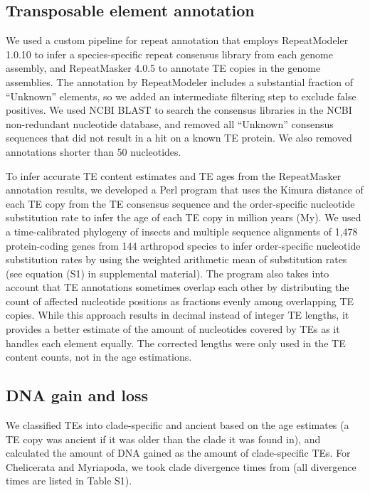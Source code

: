 \subsection{Transposable element
annotation}\label{transposable-element-annotation}

We used a custom pipeline for repeat annotation that employs
RepeatModeler 1.0.10 \citep{Smit2015} to infer a species-specific
repeat consensus library from each genome assembly, and RepeatMasker
4.0.5 \citep{Smit2015a} to annotate TE copies in the genome
assemblies. The annotation by RepeatModeler includes a substantial
fraction of ``Unknown'' elements, so we added an intermediate filtering
step to exclude false positives. We used NCBI BLAST to search the
consensus libraries in the NCBI non-redundant nucleotide database, and
removed all ``Unknown'' consensus sequences that did not result in a hit
on a known TE protein. We also removed annotations shorter than 50
nucleotides.

To infer accurate TE content estimates and TE ages from the RepeatMasker
annotation results, we developed a Perl program that uses the Kimura
distance of each TE copy from the TE consensus sequence and the
order-specific nucleotide substitution rate to infer the age of each TE
copy in million years (My). We used a time-calibrated phylogeny of
insects \citep{Misof2014} and multiple sequence alignments of 1,478
protein-coding genes from 144 arthropod species \citep{Misof2014} to
infer order-specific nucleotide substitution rates by using the weighted
arithmetic mean of substitution rates (see equation (S1) in supplemental
material). The program also takes into account that TE annotations
sometimes overlap each other by distributing the count of affected
nucleotide positions as fractions evenly among overlapping TE copies.
While this approach results in decimal instead of integer TE lengths, it
provides a better estimate of the amount of nucleotides covered by TEs
as it handles each element equally. The corrected lengths were only used
in the TE content counts, not in the age estimations.

\subsection{DNA gain and loss}\label{dna-gain-and-loss}

We classified TEs into clade-specific and ancient based on the age
estimates (a TE copy was ancient if it was older than the clade it was
found in), and calculated the amount of DNA gained as the amount of
clade-specific TEs. For Chelicerata and Myriapoda, we took clade
divergence times from \citet{Misof2014} (all divergence times are
listed in Table S1).

